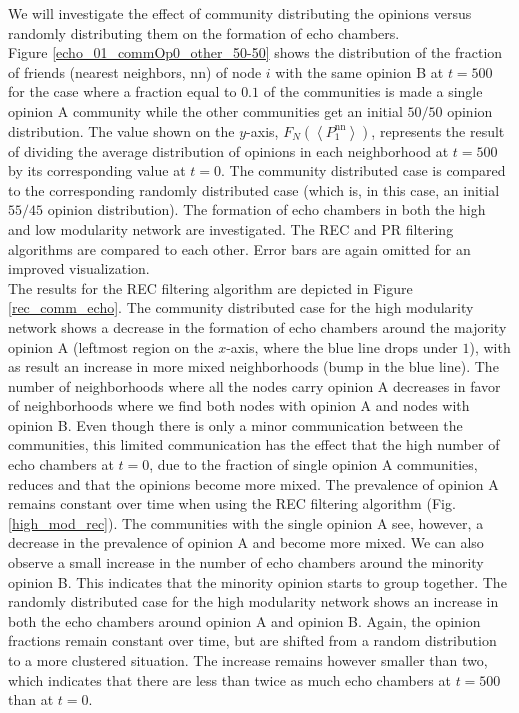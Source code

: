 \documentclass[11 pt , letterpaper , twoside , openright]{book}
\begin{document}
We will investigate the effect of community distributing the opinions versus randomly distributing them on the formation of echo chambers. \\
\newline
Figure \ref{echo_01_commOp0_other_50-50} shows the distribution of the fraction of friends (nearest neighbors, nn) of node $i$ with the same opinion B at $t=500$ for the case where a fraction equal to $0.1$ of the communities is made a single opinion A community while the other communities get an initial $50/50$ opinion distribution. The value shown on the $y$-axis, $F_N(\left<P_1^{\text{nn}}\right>)$, represents the result of dividing the average distribution of opinions in each neighborhood at $t=500$ by its corresponding value at $t=0$. The community distributed case is compared to the corresponding randomly distributed case (which is, in this case, an initial $55/45$ opinion distribution). The formation of echo chambers in both the high and low modularity network are investigated. The REC and PR filtering algorithms are compared to each other. Error bars are again omitted for an improved visualization.\\
\newline
The results for the REC filtering algorithm are depicted in Figure \ref{rec_comm_echo}. The community distributed case for the high modularity network shows a decrease in the formation of echo chambers around the majority opinion A (leftmost region on the $x$-axis, where the blue line drops under $1$), with as result an increase in more mixed neighborhoods (bump in the blue line). The number of neighborhoods where all the nodes carry opinion A decreases in favor of neighborhoods where we find both nodes with opinion A and nodes with opinion B. Even though there is only a minor communication between the communities, this limited communication has the effect that the high number of echo chambers at $t=0$, due to the fraction of single opinion A communities, reduces and that the opinions become more mixed. The prevalence of opinion A remains constant over time when using the REC filtering algorithm (Fig. \ref{high_mod_rec}). The communities with the single opinion A see, however, a decrease in the prevalence of opinion A and become more mixed. We can also observe a small increase in the number of echo chambers around the minority opinion B. This indicates that the minority opinion starts to group together. The randomly distributed case for the high modularity network shows an increase in both the echo chambers around opinion A and opinion B. Again, the opinion fractions remain constant over time, but are shifted from a random distribution to a more clustered situation. The increase remains however smaller than two, which indicates that there are less than twice as much echo chambers at $t=500$ than at $t=0$.\\
\end{document}
